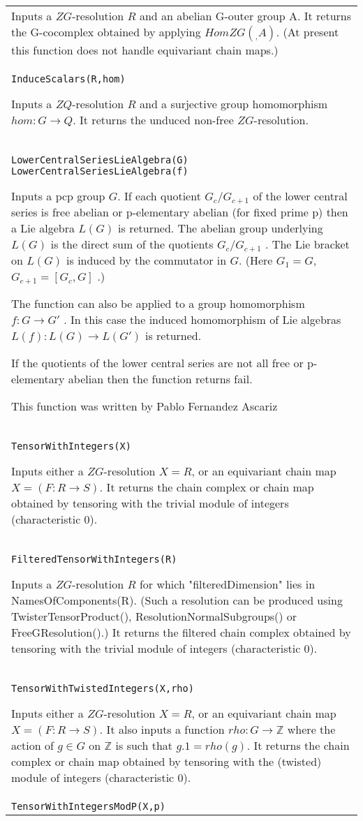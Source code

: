 \documentclass[a4paper,11pt]{report}
\begin{document}
{\begin{center}
\begin{tabular}{|l|}
 Inputs a $ZG$-resolution $R$ and an abelian G-outer group A. It returns the G-cocomplex obtained by
applying $HomZG( _ , A)$. (At present this function does not handle equivariant chain maps.) \\
 \index{InduceScalars} \texttt{InduceScalars(R,hom) } 

 Inputs a $ZQ$-resolution $R$ and a surjective group homomorphism $hom:G\rightarrow Q$. It returns the unduced non-free $ZG$-resolution. \\
 \index{LowerCentralSeriesLieAlgebra} \texttt{LowerCentralSeriesLieAlgebra(G) } \texttt{LowerCentralSeriesLieAlgebra(f) } 

 Inputs a pcp group $G$. If each quotient $G_c/G_{c+1}$ of the lower central series is free abelian or p-elementary abelian (for fixed
prime p) then a Lie algebra $L(G)$ is returned. The abelian group underlying $L(G)$ is the direct sum of the quotients $G_c/G_{c+1}$ . The Lie bracket on $L(G)$ is induced by the commutator in $G$. (Here $G_1=G$, $G_{c+1}=[G_c,G]$ .) 

 The function can also be applied to a group homomorphism $f: G \longrightarrow G'$ . In this case the induced homomorphism of Lie algebras $L(f):L(G) \longrightarrow L(G')$ is returned.

 If the quotients of the lower central series are not all free or p-elementary
abelian then the function returns fail.

 This function was written by Pablo Fernandez Ascariz \\
 \index{TensorWithIntegers} \texttt{TensorWithIntegers(X) } 

 Inputs either a $ZG$-resolution $X=R$, or an equivariant chain map $X = (F:R \longrightarrow S)$. It returns the chain complex or chain map obtained by tensoring with the
trivial module of integers (characteristic 0). \\
 \index{FilteredTensorWithIntegers} \texttt{FilteredTensorWithIntegers(R) } 

 Inputs a $ZG$-resolution $R$ for which "filteredDimension" lies in NamesOfComponents(R). (Such a resolution
can be produced using TwisterTensorProduct(), ResolutionNormalSubgroups() or
FreeGResolution().) It returns the filtered chain complex obtained by
tensoring with the trivial module of integers (characteristic 0). \\
 \index{TensorWithTwistedIntegers} \texttt{TensorWithTwistedIntegers(X,rho) } 

 Inputs either a $ZG$-resolution $X=R$, or an equivariant chain map $X = (F:R \longrightarrow S)$. It also inputs a function $rho\colon G\rightarrow \mathbb Z$ where the action of $g \in G$ on $\mathbb Z$ is such that $g.1 = rho(g)$. It returns the chain complex or chain map obtained by tensoring with the
(twisted) module of integers (characteristic 0). \\
 \index{TensorWithIntegersModP} \texttt{TensorWithIntegersModP(X,p) } 


\end{tabular}
\end{center}}
\end{document}

